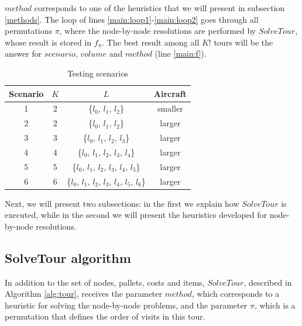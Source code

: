 \documentclass[preprint,authoryear]{elsarticle}
\begin{document}
$method$\/ corresponds to one of the heuristics that we will present in subsection \ref{methods}. The loop of lines \ref{main:loop1}-\ref{main:loop2} goes through all permutations $\pi$, where the node-by-node resolutions are performed by $SolveTour$, whose result is stored in $f_{\pi}$. The best result among all $K!$\/ tours will be the answer for $scenario$, $volume$\/ and $method$\/ (line \ref{main:f}). 

\vspace{2.0mm}
\begin{table}[H]
	\centering
	\caption{Testing scenarios}  \label{tab:scenarios}
	\begin{tabular}{c c c c }
		\toprule
		{\bf Scenario} & {$K$} & {$L$} & {\bf Aircraft} \\		
		\midrule
		1 & 2    & \{$l_0$, $l_1$, $l_2$\}                                 & smaller \\
		2 & 2    & \{$l_0$, $l_1$, $l_2$\}                                 & larger  \\
		3 & 3    & \{$l_0$, $l_1$, $l_2$, $l_3$\}                          & larger  \\
		4 & 4    & \{$l_0$, $l_1$, $l_2$, $l_3$, $l_4$\}                   & larger  \\
		5 & 5    & \{$l_0$, $l_1$, $l_2$, $l_3$, $l_4$, $l_5$\}            & larger  \\
		6 & 6    & \{$l_0$, $l_1$, $l_2$, $l_3$, $l_4$, $l_5$, $l_6$\}     & larger  \\
		\bottomrule
	\end{tabular}
\end{table}

Next, we will present two subsections: in the first we explain how $SolveTour$ is executed, while in the second we will present the heuristics developed for node-by-node resolutions.


\subsection{SolveTour algorithm}
\label{tour}

In addition to the set of nodes, pallets, costs and items, $SolveTour$, described in Algorithm \ref{alg:tour}, receives the parameter $method$, which corresponds to a heuristic for solving the node-by-node problems, and the parameter $\pi$, which is a permutation that defines the order of visits in this tour.
\end{document}
